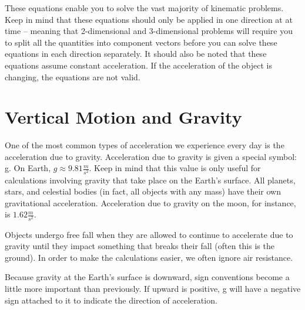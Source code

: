 These equations enable you to solve the vast majority of kinematic problems.  Keep in mind that these equations should only be applied in one direction at at time – meaning that 2-dimensional and 3-dimensional problems will require you to split all the quantities into component vectors before you can solve these equations in each direction separately. It should also be noted that these equations assume constant acceleration.  If the acceleration of the object is changing, the equations are not valid.



\section{Vertical Motion and Gravity}

One of the most common types of acceleration we experience every day is the acceleration due to gravity.  Acceleration due to gravity is given a special symbol: g.  On Earth, $g \approx  9.81 \frac{m}{s^2}$.  Keep in mind that this value is only useful for calculations involving gravity that take place on the Earth's surface.  All planets, stars, and celestial bodies (in fact, all objects with any mass) have their own gravitational acceleration.  Acceleration due to gravity on the moon, for instance, is $1.62 \frac{m}{s^2}$.    

Objects undergo free fall when they are allowed to continue to accelerate due to gravity until they impact something that breaks their fall (often this is the ground).  In order to make the calculations easier, we often ignore air resistance.

Because gravity at the Earth's surface is downward, sign conventions become a little more important than previously.  If upward is positive, g will have a negative sign attached to it to indicate the direction of acceleration.  


